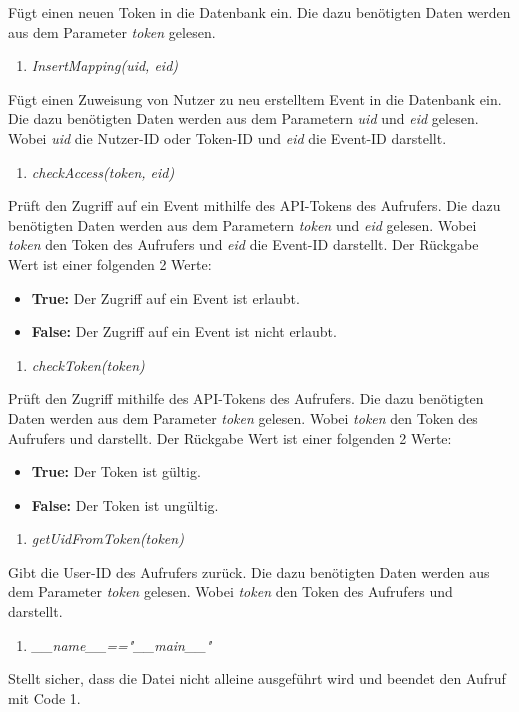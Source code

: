 \documentclass[12pt,parskip=full, pagea4]{scrreprt}
\begin{document}
			\leftskip=1.5cm	F\"ugt einen neuen Token in die Datenbank ein. Die dazu benötigten Daten werden aus dem Parameter \textit{token} gelesen.
			\begin{enumerate}[resume]
				\item \textit{InsertMapping(uid, eid)}
			\end{enumerate}
			\leftskip=1.5cm	F\"ugt einen Zuweisung von Nutzer zu neu erstelltem Event in die Datenbank ein. Die dazu benötigten Daten werden aus dem Parametern \textit{uid} und \textit{eid} gelesen. Wobei \textit{uid} die Nutzer-ID oder Token-ID und \textit{eid} die Event-ID darstellt.
			\begin{enumerate}[resume]
				\item \textit{checkAccess(token, eid)}
			\end{enumerate}
			\leftskip=1.5cm	Pr\"uft den Zugriff auf ein Event mithilfe des API-Tokens des Aufrufers. Die dazu benötigten Daten werden aus dem Parametern \textit{token} und \textit{eid} gelesen. Wobei \textit{token} den Token des Aufrufers und \textit{eid} die Event-ID darstellt. Der Rückgabe Wert ist einer folgenden 2 Werte:
			\begin{itemize}
				\item \leftskip=1.5cm \textbf{True:} Der Zugriff auf ein Event ist erlaubt.
				\item \leftskip=1.5cm \textbf{False:} Der Zugriff auf ein Event ist nicht erlaubt.
			\end{itemize}
				\begin{enumerate}[resume]
				\item \textit{checkToken(token)}
			\end{enumerate}
			\leftskip=1.5cm	Pr\"uft den Zugriff mithilfe des API-Tokens des Aufrufers. Die dazu benötigten Daten werden aus dem Parameter \textit{token} gelesen. Wobei \textit{token} den Token des Aufrufers und darstellt. Der Rückgabe Wert ist einer folgenden 2 Werte:
			\begin{itemize}
				\item \leftskip=1.5cm \textbf{True:} Der Token ist g\"ultig.
				\item \leftskip=1.5cm \textbf{False:} Der Token ist ung\"ultig.
			\end{itemize}
			\begin{enumerate}[resume]
				\item \textit{getUidFromToken(token)}
			\end{enumerate}
			\leftskip=1.5cm	Gibt die User-ID des Aufrufers zur\"uck. Die dazu benötigten Daten werden aus dem Parameter \textit{token} gelesen. Wobei \textit{token} den Token des Aufrufers und darstellt. 
			\begin{enumerate}[resume]
				\item \textit{\_\_name\_\_=="\_\_main\_\_"}	
			\end{enumerate}
			\leftskip=1.5cm	Stellt sicher, dass die Datei nicht alleine ausgeführt wird und beendet den Aufruf mit Code 1.
			
\end{document}

